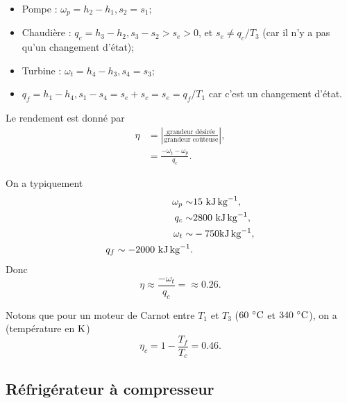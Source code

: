         \begin{itemize}
            \item Pompe : $\omega_p=h_2-h_1, s_2=s_1$;
            \item Chaudière : $q_c=h_3-h_2, s_3-s_2>s_e>0$, et $s_e\neq q_c/T_3$ (car il n'y a pas qu'un changement d'état);
            \item Turbine : $\omega_t=h_4-h_3,s_4=s_3$;
            \item $q_f=h_1-h_4,s_1-s_4=s_e+s_c=s_e=q_f/T_1$ car c'est un changement d'état.
        \end{itemize}

        Le rendement est donné par 
        \begin{align}
            \eta
            &=
            \left\lvert\frac{\text{grandeur désirée}}{\text{grandeur coûteuse}}\right\rvert,\\
            &=\frac{-\omega_t-\omega_p}{q_c}.
        \end{align}

        On a typiquement
        \begin{equation}
            \begin{aligned}
                \omega_p\sim&15~\si[]{\kilo\joule\per\kilogram},\\
                q_c\sim&2800~\si[]{\kilo\joule\per\kilogram},\\
                \omega_t\sim&-750\si[]{\kilo\joule\per\kilogram},\\
                q_f\sim-2000~\si[]{\kilo\joule\per\kilogram}.
            \end{aligned}
        \end{equation}
        Donc 
        \begin{equation}
            \boxed{
                \eta\approx\frac{-\omega_t}{q_c}=\approx 0.26.
            }
        \end{equation}

        Notons que pour un moteur de Carnot entre $T_1$ et $T_3$ ($60~\si[]{\celsius}$ et $340~\si[]{\celsius}$), on a (température en $\si[]{\kelvin}$)
        \begin{equation}
            \eta_c=1-\frac{T_f}{T_c}=0.46.
        \end{equation}

    \subsection{Réfrigérateur à compresseur}
        
